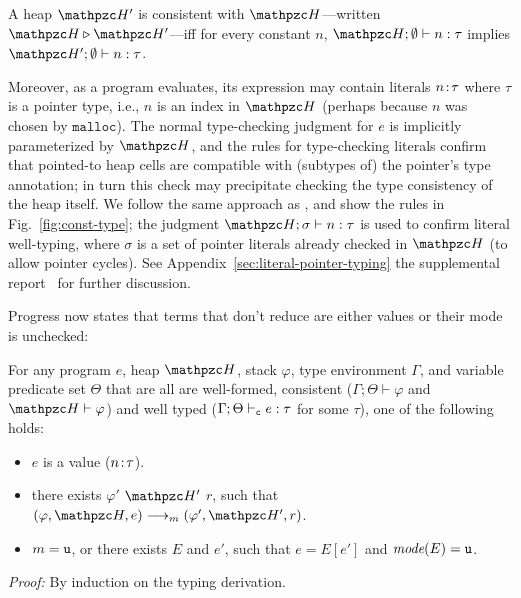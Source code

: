 \begin{defi}
A heap $\heap'$ is consistent with $\heap$---written $\heap \triangleright \heap'$---iff
for every constant $n$, $\heap;\emptyset \vdash n:\tau$ implies $\heap';\emptyset \vdash n:\tau$.
\end{defi}

Moreover, as a program evaluates, its expression may contain literals
${n}\!:\!{\tau}$ where $\tau$ is a pointer type, i.e., $n$ is an
index in $\heap$ (perhaps because $n$ was chosen by
$\mathtt{malloc}$). The normal type-checking judgment for $e$ is
implicitly parameterized by $\heap$, and the rules for type-checking
literals confirm that pointed-to heap cells are compatible with
(subtypes of) the pointer's type annotation; in turn this check may
precipitate checking the type consistency of the heap itself. We
follow the same approach as \citet{ruef18checkedc-incr}, and show the
rules in
  Fig.~\ref{fig:const-type}; the judgment
  $\heap;\sigma \vdash n : \tau$ is used to confirm literal
  well-typing, where $\sigma$ is a set of pointer literals already
  checked in $\heap$ (to allow pointer cycles). See
  \iftr
  Appendix~\ref{sec:literal-pointer-typing}
  \else
  the supplemental report~\cite{checkedc-tech-report}
  \fi
   for further discussion.

Progress now states that terms that don't reduce are either values or their
mode is unchecked:

\begin{thm}[Progress]\label{thm:progress}

For any \checkedc program $e$, heap $\heap$, stack
$\varphi$, type environment $\Gamma$, and variable predicate set $\Theta$
that are all are well-formed, consistent
($\Gamma;\Theta\vdash \varphi$ and $\heap \vdash \varphi$) and well
typed ($\Gamma;\Theta\vdash_{\texttt{c}} e : \tau$ for some $\tau$),
one of the following holds:

\begin{itemize}

\item $e$ is a value (${n}\!:\!{\tau}$).

\item there exists $\varphi'$ $\heap'$ $r$, such that $(\varphi,\heap,e) \longrightarrow_m (\varphi',\heap',r)$.

\item $m = \texttt{u}$, or there exists $E$ and $e'$, such that $e = E[e']$ and $\textit{mode}(E) = \texttt{u}$.

\end{itemize}
\end{thm}
{\em Proof:} By induction on the typing derivation.

